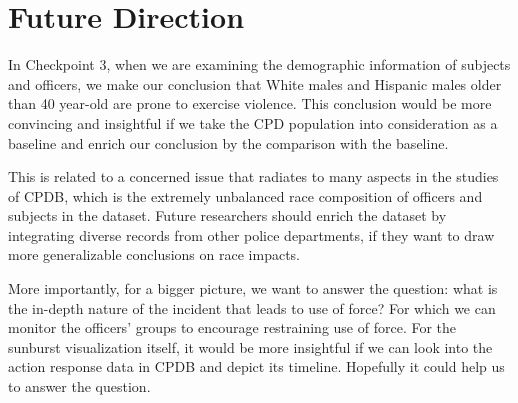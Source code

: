 \documentclass[10pt]{article}
\begin{document}
\section*{Future Direction}

In Checkpoint 3, when we are examining the demographic information of subjects and officers, we make our conclusion that White males and Hispanic males older than 40 year-old are prone to exercise violence. This conclusion would be more convincing and insightful if we take the CPD population into consideration as a baseline and enrich our conclusion by the comparison with the baseline.

This is related to a concerned issue that radiates to many aspects in the studies of CPDB, which is the extremely unbalanced race composition of officers and subjects in the dataset. Future researchers should enrich the dataset by integrating diverse records from other police departments, if they want to draw more generalizable conclusions on race impacts.

More importantly, for a bigger picture, we want to answer the question: what is the in-depth nature of the incident that leads to use of force? For which we can monitor the officers' groups to encourage restraining use of force. For the sunburst visualization itself, it would be more insightful if we can look into the action response data in CPDB and depict its timeline. Hopefully it could help us to answer the question.
\end{document}
